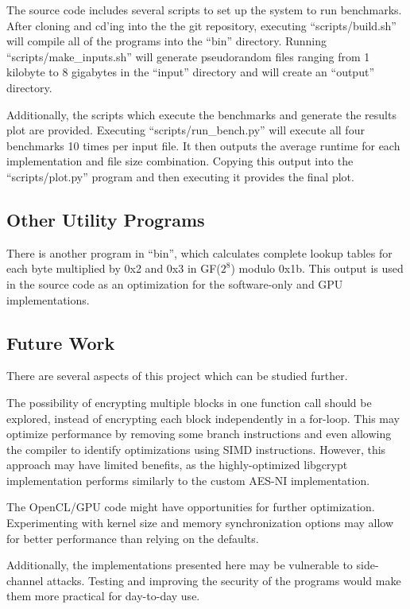\documentclass[a4paper,10pt]{article}
\begin{document}
The source code includes several scripts to set up the system to run benchmarks.  After cloning and cd'ing into the the git repository, executing ``scripts/build.sh'' will compile all of the programs into the ``bin'' directory. Running ``scripts/make\_inputs.sh'' will generate pseudorandom files ranging from 1 kilobyte to 8 gigabytes in the ``input'' directory and will create an ``output'' directory.

Additionally, the scripts which execute the benchmarks and generate the results plot are provided.  Executing ``scripts/run\_bench.py'' will execute all four benchmarks 10 times per input file.  It then outputs the average runtime for each implementation and file size combination.  Copying this output into the ``scripts/plot.py'' program and then executing it provides the final plot.

\subsection{Other Utility Programs}

There is another program in ``bin'', which calculates complete lookup tables for each byte multiplied by 0x2 and 0x3 in GF($2^8$) modulo 0x1b.  This output is used in the source code as an optimization for the software-only and GPU implementations.

\subsection{Future Work}

There are several aspects of this project which can be studied further.

The possibility of encrypting multiple blocks in one function call should be explored, instead of encrypting each block independently in a for-loop. This may optimize performance by removing some branch instructions and even allowing the compiler to identify optimizations using SIMD instructions.  However, this approach may have limited benefits, as the highly-optimized libgcrypt implementation performs similarly to the custom AES-NI implementation.

The OpenCL/GPU code might have opportunities for further optimization.  Experimenting with kernel size and memory synchronization options may allow for better performance than relying on the defaults.

Additionally, the implementations presented here may be vulnerable to side-channel attacks.  Testing and improving the security of the programs would make them more practical for day-to-day use.



\end{document}
